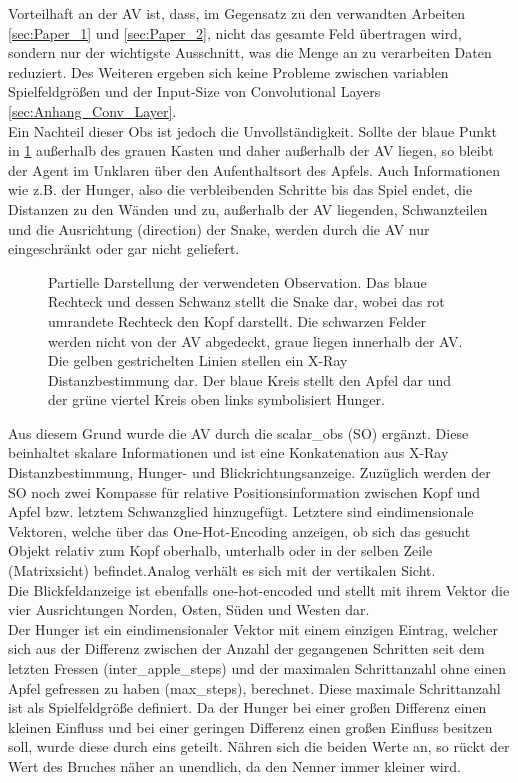 Vorteilhaft an der AV ist, dass, im Gegensatz zu den verwandten Arbeiten \ref{sec:Paper_1} und \ref{sec:Paper_2}, nicht das gesamte Feld übertragen wird, sondern nur der wichtigste Ausschnitt, was die Menge an zu verarbeiten Daten reduziert. Des Weiteren ergeben sich keine Probleme zwischen variablen Spielfeldgrößen und der Input-Size von Convolutional Layers \ref{sec:Anhang_Conv_Layer}.\\
Ein Nachteil dieser Obs ist jedoch die Unvollständigkeit. Sollte der blaue Punkt in \ref{fig:Observation} außerhalb des grauen Kasten und daher außerhalb der AV liegen, so bleibt der Agent im Unklaren über den Aufenthaltsort des Apfels.
Auch Informationen wie z.B. der Hunger, also die verbleibenden Schritte bis das Spiel endet, die Distanzen zu den Wänden und zu, außerhalb der AV liegenden, Schwanzteilen und die Ausrichtung (direction) der Snake, werden durch die AV nur eingeschränkt oder gar nicht geliefert.
\begin{figure}[H]
	\centering
	\def\svgscale{0.80}
	
	\caption[Observation]{Partielle Darstellung der verwendeten Observation. Das blaue Rechteck und dessen Schwanz stellt die Snake dar, wobei das rot umrandete Rechteck den Kopf darstellt. Die schwarzen Felder werden nicht von der AV abgedeckt, graue liegen innerhalb der AV. 
		Die gelben gestrichelten Linien stellen ein X-Ray Distanzbestimmung dar. Der blaue Kreis stellt den Apfel dar und der grüne viertel Kreis oben links symbolisiert Hunger.}
	\label{fig:Observation}
\end{figure}
Aus diesem Grund wurde die AV durch die scalar\_obs (SO) ergänzt. Diese beinhaltet skalare Informationen und ist eine Konkatenation aus X-Ray Distanzbestimmung, Hunger- und Blickrichtungsanzeige. Zuzüglich werden der SO noch zwei Kompasse für relative Positionsinformation zwischen Kopf und Apfel bzw. letztem Schwanzglied hinzugefügt.
Letztere sind eindimensionale Vektoren, welche über das One-Hot-Encoding anzeigen, ob sich das gesucht Objekt relativ zum Kopf oberhalb, unterhalb oder in der selben Zeile (Matrixsicht) befindet.Analog verhält es sich mit der vertikalen Sicht.\\
Die Blickfeldanzeige ist ebenfalls one-hot-encoded und stellt mit ihrem Vektor die vier Ausrichtungen Norden, Osten, Süden und Westen dar.\\
Der Hunger ist ein eindimensionaler Vektor mit einem einzigen Eintrag, welcher sich aus der Differenz zwischen der Anzahl der gegangenen Schritten seit dem letzten Fressen (inter\_apple\_steps) und der maximalen Schrittanzahl ohne einen Apfel gefressen zu haben (max\_steps), berechnet. Diese maximale Schrittanzahl ist als Spielfeldgröße definiert. Da der Hunger bei einer großen Differenz einen kleinen Einfluss und bei einer geringen Differenz einen großen Einfluss besitzen soll, wurde diese durch eins geteilt. Nähren sich die beiden Werte an, so rückt der Wert des Bruches näher an unendlich, da den Nenner immer kleiner wird.
